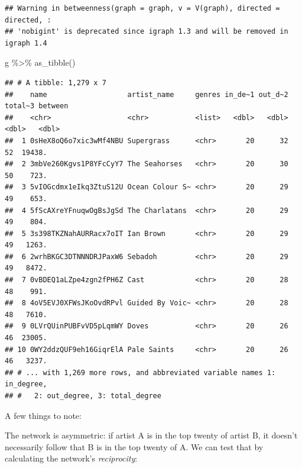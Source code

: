 \documentclass[
]{book}
\newenvironment{Shaded}{\begin{snugshade}}{\end{snugshade}}
\newcommand{\FunctionTok}[1]{\textcolor[rgb]{0.00,0.00,0.00}{#1}}
\newcommand{\NormalTok}[1]{#1}
\newcommand{\SpecialCharTok}[1]{\textcolor[rgb]{0.00,0.00,0.00}{#1}}
\begin{document}
\begin{verbatim}
## Warning in betweenness(graph = graph, v = V(graph), directed = directed, :
## 'nobigint' is deprecated since igraph 1.3 and will be removed in igraph 1.4
\end{verbatim}

\begin{Shaded}
\begin{Highlighting}[]
\NormalTok{g }\SpecialCharTok{\%\textgreater{}\%} \FunctionTok{as\_tibble}\NormalTok{() }
\end{Highlighting}
\end{Shaded}

\begin{verbatim}
## # A tibble: 1,279 x 7
##    name                   artist_name     genres in_de~1 out_d~2 total~3 between
##    <chr>                  <chr>           <list>   <dbl>   <dbl>   <dbl>   <dbl>
##  1 0sHeX8oQ6o7xic3wMf4NBU Supergrass      <chr>       20      32      52  19438.
##  2 3mbVe260Kgvs1P8YFcCyY7 The Seahorses   <chr>       20      30      50    723.
##  3 5vIOGcdmx1eIkq3ZtuS12U Ocean Colour S~ <chr>       20      29      49    653.
##  4 5fScAXreYFnuqwOgBsJgSd The Charlatans  <chr>       20      29      49    804.
##  5 3s398TKZNahAURRacx7oIT Ian Brown       <chr>       20      29      49   1263.
##  6 2wrhBKGC3DTNNNDRJPaxW6 Sebadoh         <chr>       20      29      49   8472.
##  7 0vBDEQ1aLZpe4zgn2fPH6Z Cast            <chr>       20      28      48    991.
##  8 4oV5EVJ0XFWsJKoOvdRPvl Guided By Voic~ <chr>       20      28      48   7610.
##  9 0LVrQUinPUBFvVD5pLqmWY Doves           <chr>       20      26      46  23005.
## 10 0WY2ddzQUF9eh16GiqrElA Pale Saints     <chr>       20      26      46   3237.
## # ... with 1,269 more rows, and abbreviated variable names 1: in_degree,
## #   2: out_degree, 3: total_degree
\end{verbatim}

A few things to note:

The network is asymmetric: if artist A is in the top twenty of artist B, it doesn't necessarily follow that B is in the top twenty of A. We can test that by calculating the network's \emph{reciprocity}:

\begin{Shaded}
\end{Shaded}
\end{document}
